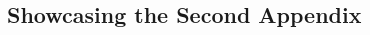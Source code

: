 
\begin{landscapemode}{297mm}{420mm}
    \chapter{Showcasing the Second Appendix}
    \blindtext[5]
\end{landscapemode}